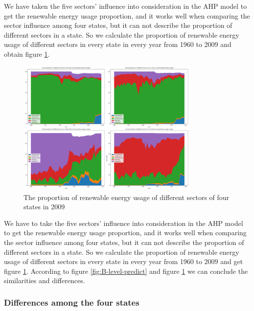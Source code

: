 \documentclass[a4paper,11pt]{article}
\begin{document}
\par We have taken the five sectors' influence into consideration in the AHP model to get the renewable energy usage proportion, and it works well when comparing the sector influence among four states, but it can not describe the proportion of different sectors in a state. So we calculate the proportion of renewable energy usage of different sectors in every state in every year from 1960 to 2009 and obtain figure \ref{fig:B-percent}.
\begin{figure}[H]%
    \centering 
    \includegraphics[width=0.8\textwidth]{./Pic/B-percent.png}
    \caption{The proportion of renewable energy usage of different sectors of four states in 2009}
    \label{fig:B-percent}  
\end{figure}

\par We have to take the five sectors' influence into consideration in the AHP model to get the renewable energy usage proportion, and it works well when comparing the sector influence among four states, but it can not describe the proportion of different sectors in a state. So we calculate the proportion of renewable energy usage of different sectors in every state in every year from 1960 to 2009 and get figure \ref{fig:B-percent}. According to figure \ref{fig:B-level-predict} and figure \ref{fig:B-percent} we can conclude the similarities and differences.


\subsubsection{Differences among the four states}
\end{document}
